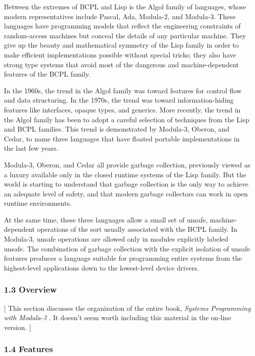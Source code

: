 \documentclass[10pt]{article}
\begin{document}
Between the extremes of BCPL and Lisp is the Algol family of languages, whose
modern representatives include Pascal, Ada, Modula-2, and Modula-3. These
languages have programming models that reflect the engineering constraints of
random-access machines but conceal the details of any particular machine. They
give up the beauty and mathematical symmetry of the Lisp family in order to
make efficient implementations possible without special tricks; they also have
strong type systems that avoid most of the dangerous and machine-dependent
features of the BCPL family.

In the 1960s, the trend in the Algol family was toward features for control
flow and data structuring. In the 1970s, the trend was toward
information-hiding features like interfaces, opaque types, and generics. More
recently, the trend in the Algol family has been to adopt a careful selection
of techniques from the Lisp and BCPL families. This trend is demonstrated by
Modula-3, Oberon, and Cedar, to name three languages that have floated
portable implementations in the last few years.

Modula-3, Oberon, and Cedar all provide garbage collection, previously viewed
as a luxury available only in the closed runtime systems of the Lisp
family. But the world is starting to understand that garbage collection is the
only way to achieve an adequate level of safety, and that modern garbage
collectors can work in open runtime environments.

At the same time, these three languages allow a small set of unsafe, machine-dependent operations of the sort usually associated with the BCPL family. In Modula-3, unsafe operations are allowed only in modules explicitly labeled unsafe. The combination of garbage collection with the explicit isolation of unsafe features produces a language suitable for programming entire systems from the highest-level applications down to the lowest-level device drivers.

\subsubsection*{1.3 Overview}

[ This section discusses the organization of the entire book, \emph{Systems
  Programming with Modula-3} . It doesn't seem worth including this material
in the on-line version. ]
\subsubsection*{1.4 Features}
\end{document}

